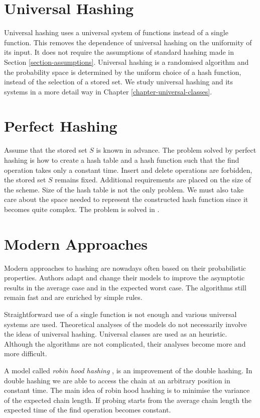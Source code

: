 \section{Universal Hashing}
Universal hashing uses a universal system of functions instead of a single function. This removes the dependence of universal hashing on the uniformity of its input. It does not require the assumptions of standard hashing made in Section \ref{section-assumptions}. Universal hashing is a randomised algorithm and the probability space is determined by the uniform choice of a hash function, instead of the selection of a stored set. We study universal hashing and its systems in a more detail way in Chapter \ref{chapter-universal-classes}.

\section{Perfect Hashing}
Assume that the stored set $S$ is known in advance. The problem solved by perfect hashing is how to create a hash table and a hash function such that the find operation takes only a constant time. Insert and delete operations are forbidden, the stored set $S$ remains fixed. Additional requirements are placed on the size of the scheme. Size of the hash table is not the only problem. We must also take care about the space needed to represent the constructed hash function since it becomes quite complex. The problem is solved in \cite{1884}.

\section{Modern Approaches}
\label{section-modern-approaches}
Modern approaches to hashing are nowadays often based on their probabilistic properties. Authors adapt and change their models to improve the asymptotic results in the average case and in the expected worst case. The algorithms still remain fast and are enriched by simple rules. 

Straightforward use of a single function is not enough and various universal systems are used. Theoretical analyses of the models do not necessarily involve the ideas of universal hashing. Universal classes are used as an heuristic. Although the algorithms are not complicated, their analyses become more and more difficult.

A model called \emph{robin hood hashing} \cite{10.1109/SFCS.1985.48}, \cite{Devroye04onworst} is an improvement of the double hashing. In double hashing we are able to access the chain at an arbitrary position in constant time. The main idea of robin hood hashing is to minimise the variance of the expected chain length. If probing starts from the average chain length the expected time of the find operation becomes constant.

